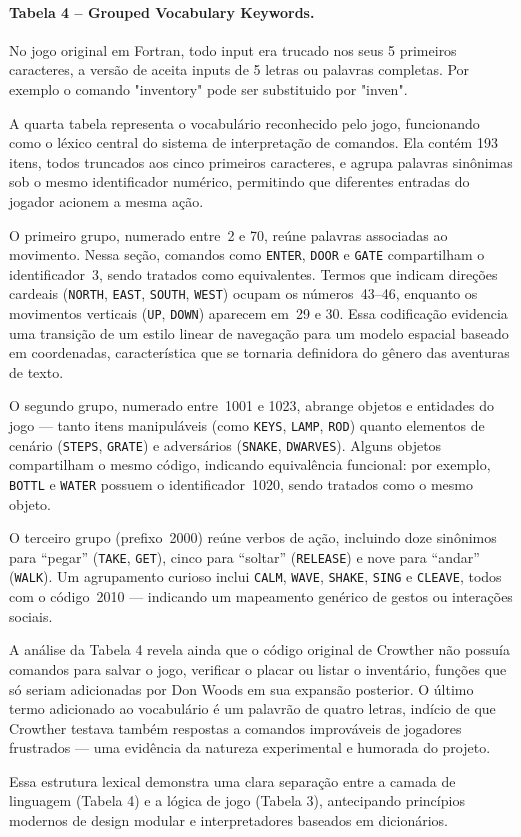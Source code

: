 \documentclass[12pt,a4paper]{article}
\begin{document}
\paragraph{Tabela 4 – Grouped Vocabulary Keywords.}
No jogo original em Fortran, todo input era trucado nos seus 5 primeiros caracteres, a versão de \textcite{rhodes_adventure_py} aceita inputs de 5 letras ou palavras completas. Por exemplo o comando "inventory" pode ser substituido por "inven". 

A quarta tabela representa o vocabulário reconhecido pelo jogo, funcionando como o léxico central do sistema de interpretação de comandos. Ela contém 193 itens, todos truncados aos cinco primeiros caracteres, e agrupa palavras sinônimas sob o mesmo identificador numérico, permitindo que diferentes entradas do jogador acionem a mesma ação.  

O primeiro grupo, numerado entre~2 e 70, reúne palavras associadas ao movimento. Nessa seção, comandos como \texttt{ENTER}, \texttt{DOOR} e \texttt{GATE} compartilham o identificador~3, sendo tratados como equivalentes. Termos que indicam direções cardeais (\texttt{NORTH}, \texttt{EAST}, \texttt{SOUTH}, \texttt{WEST}) ocupam os números~43–46, enquanto os movimentos verticais (\texttt{UP}, \texttt{DOWN}) aparecem em~29 e 30. Essa codificação evidencia uma transição de um estilo linear de navegação para um modelo espacial baseado em coordenadas, característica que se tornaria definidora do gênero das aventuras de texto.

O segundo grupo, numerado entre~1001 e 1023, abrange objetos e entidades do jogo — tanto itens manipuláveis (como \texttt{KEYS}, \texttt{LAMP}, \texttt{ROD}) quanto elementos de cenário (\texttt{STEPS}, \texttt{GRATE}) e adversários (\texttt{SNAKE}, \texttt{DWARVES}). Alguns objetos compartilham o mesmo código, indicando equivalência funcional: por exemplo, \texttt{BOTTL} e \texttt{WATER} possuem o identificador~1020, sendo tratados como o mesmo objeto.  

O terceiro grupo (prefixo~2000) reúne verbos de ação, incluindo doze sinônimos para “pegar” (\texttt{TAKE}, \texttt{GET}), cinco para “soltar” (\texttt{RELEASE}) e nove para “andar” (\texttt{WALK}). Um agrupamento curioso inclui \texttt{CALM}, \texttt{WAVE}, \texttt{SHAKE}, \texttt{SING} e \texttt{CLEAVE}, todos com o código~2010 — indicando um mapeamento genérico de gestos ou interações sociais.  

A análise da Tabela 4 revela ainda que o código original de Crowther não possuía comandos para salvar o jogo, verificar o placar ou listar o inventário, funções que só seriam adicionadas por Don Woods em sua expansão posterior. O último termo adicionado ao vocabulário é um palavrão de quatro letras, indício de que Crowther testava também respostas a comandos improváveis de jogadores frustrados — uma evidência da natureza experimental e humorada do projeto.  

Essa estrutura lexical demonstra uma clara separação entre a camada de linguagem (Tabela 4) e a lógica de jogo (Tabela 3), antecipando princípios modernos de design modular e interpretadores baseados em dicionários.

\newpage

\printbibliography
\end{document}
